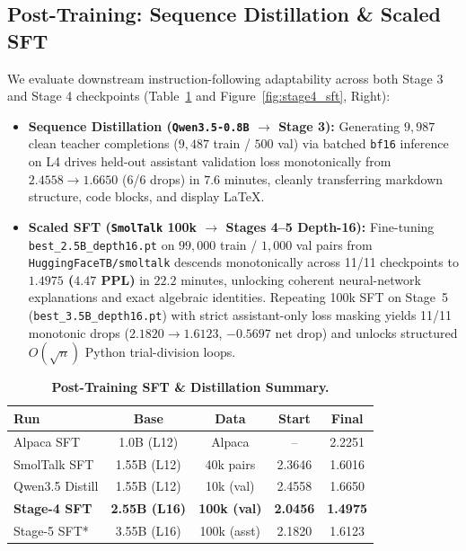 \documentclass[10pt,twocolumn]{article}
\newcommand{\toprule}{\hline\hline}
\newcommand{\midrule}{\hline}
\newcommand{\bottomrule}{\hline\hline}
\newcommand{\citep}[1]{\cite{#1}}
\begin{document}
\subsection{Post-Training: Sequence Distillation \& Scaled SFT}
We evaluate downstream instruction-following adaptability across both Stage 3 and Stage 4 checkpoints (Table~\ref{tab:sft} and Figure~\ref{fig:stage4_sft}, Right):
\begin{itemize}
    \item \textbf{Sequence Distillation (\texttt{Qwen3.5-0.8B} $\to$ Stage 3):} Generating $9{,}987$ clean teacher completions ($9{,}487$ train / $500$ val) via batched \texttt{bf16} inference on L4 drives held-out assistant validation loss monotonically from $2.4558 \to 1.6650$ (6/6 drops) in $7.6$ minutes, cleanly transferring markdown structure, code blocks, and display \LaTeX{}.
    \item \textbf{Scaled SFT (\texttt{SmolTalk} 100k $\to$ Stages 4--5 Depth-16):} Fine-tuning \texttt{best\_2.5B\_depth16.pt} on $99{,}000$ train / $1{,}000$ val pairs from \texttt{HuggingFaceTB/smoltalk} \citep{allal2025smollm2} descends monotonically across 11/11 checkpoints to \textbf{$1.4975$ ($4.47$ PPL)} in $22.2$ minutes, unlocking coherent neural-network explanations and exact algebraic identities. Repeating 100k SFT on Stage~5 (\texttt{best\_3.5B\_depth16.pt}) with strict assistant-only loss masking yields 11/11 monotonic drops ($2.1820 \to 1.6123$, $-0.5697$ net drop) and unlocks structured $O(\sqrt{n})$ Python trial-division loops.
\end{itemize}

\begin{table}[h!]
\centering
\caption{\textbf{Post-Training SFT \& Distillation Summary.}}
\label{tab:sft}
\scriptsize
\setlength{\tabcolsep}{2.4pt}
\begin{tabular}{lcccc}
\toprule
\textbf{Run} & \textbf{Base} & \textbf{Data} & \textbf{Start} & \textbf{Final} \\
\midrule
Alpaca SFT & 1.0B (L12) & Alpaca & -- & 2.2251 \\
SmolTalk SFT & 1.55B (L12) & 40k pairs & 2.3646 & 1.6016 \\
Qwen3.5 Distill & 1.55B (L12) & 10k (val) & 2.4558 & 1.6650 \\
\textbf{Stage-4 SFT} & \textbf{2.55B (L16)} & \textbf{100k (val)} & \textbf{2.0456} & \textbf{1.4975} \\
Stage-5 SFT* & 3.55B (L16) & 100k (asst) & 2.1820 & 1.6123 \\
\bottomrule
\end{tabular}
\end{table}
\end{document}

